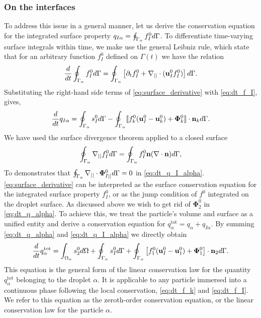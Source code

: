 \subsubsection{On the interfaces}
To address this issue in a general manner, let us derive the conservation equation for the integrated surface property $q_{I\alpha} = \oint_{\Gamma_\alpha} f_I^0 d\Gamma$.
To differentiate time-varying surface integrals within time, we make use the general Leibniz rule, which state that for an arbitrary function $f_I^0$ defined on $\Gamma(t)$ we have the relation \citep{nadim1996concise}
\begin{equation}
    \frac{d}{dt}  \oint_{\Gamma_\alpha} f_I^0  d\Gamma
    = \oint_{\Gamma_\alpha}  \left[
        \partial_t f_I^0
        +   \mathbf{\nabla}_{||} \cdot (\textbf{u}_I^0f_I^0)
    \right] d\Gamma.
    \label{eq:surface_derivative}
\end{equation}
Substituting the right-hand side terms of \ref{eq:surface_derivative} with \ref{eq:dt_f_I}, gives,
\begin{equation}
    \frac{d}{dt}  q_{I\alpha}
    = \oint_{\Gamma_\alpha}  
        s_I^0
     d\Gamma
    - \oint_{\Gamma_\alpha} 
 \llbracket 
        f_k^0 (\textbf{u}_I^0 - \textbf{u}_k^0)
        + \mathbf{\Phi}_k^0
     \rrbracket \cdot \textbf{n}_k
     d\Gamma.
    \label{eq:dt_q_I_alpha}
\end{equation}
We have used the surface divergence theorem applied to a closed surface \citep{nadim1996concise} 
\begin{equation}
    \oint_{\Gamma_\alpha} \mathbf{\nabla}_{||} f_I^0 d\Gamma
    = 
    \oint_{\Gamma_\alpha}  f_I^0 \textbf{n} (\mathbf{\nabla}\cdot \textbf{n}) d\Gamma,
    \label{eq:gauss_surface}
\end{equation} 
To demonstrates that $\oint_{\Gamma_\alpha} \mathbf{\nabla}_{||}\cdot \bm\Phi_{I||}^0 d\Gamma
= 0$ in \ref{eq:dt_q_I_alpha}. 
\ref{eq:surface_derivative} can be interpreted as the surface conservation equation for the integrated surface property $f_I^0$, or as the jump condition of $f^0$  integrated on the droplet surface. 
As discussed above we wish to get rid of $\mathbf{\Phi}_2^0$ in \ref{eq:dt_q_alpha}. 
To achieve this, we treat the particle's volume and surface as a unified entity and derive a conservation equation for $q_\alpha^\text{tot} = q_\alpha + q_{I\alpha}$. 
By summing \ref{eq:dt_q_alpha} and \ref{eq:dt_q_I_alpha} we directly obtain 
\begin{equation}
    \frac{d}{dt}  q_\alpha^\text{tot}
    = 
    \int_{\Omega_\alpha}  s_2^0  d\Omega
    + \oint_{\Gamma_\alpha}  s_I^0  d\Gamma
    + \oint_{\Gamma_\alpha}  \left[
        f_1^0 (\textbf{u}_I^0-\textbf{u}_1^0) 
        + \mathbf{\Phi}_1^0 
        \right] \cdot \textbf{n}_2  d\Gamma. 
    \label{eq:dt_q_alpha_tot}
\end{equation}
This equation is the general form of the linear conservation law for the quantity $q_\alpha^\text{tot}$ belonging to the droplet $\alpha$.
It is applicable to any particle immersed into a continuous phase following the local conservation, \ref{eq:dt_f_k} and \ref{eq:dt_f_I}.
We refer to this equation as the zeroth-order conservation equation, or the linear conservation law for the particle $\alpha$.

